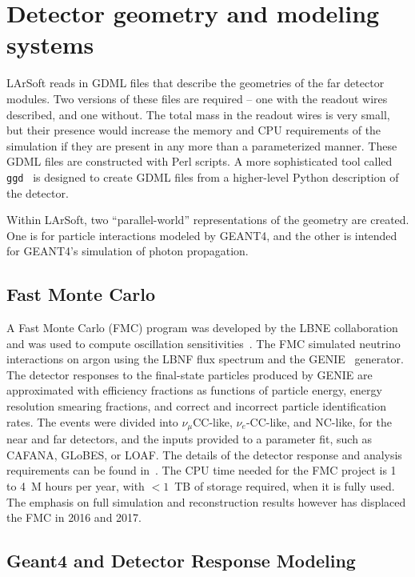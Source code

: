 \section{Detector geometry and modeling systems}

LArSoft reads in GDML files that describe the geometries of the far detector modules.  Two versions of these
files are required -- one with the readout wires described, and one without.  The total mass in the readout
wires is very small, but their presence would increase the memory and CPU requirements of the simulation
if they are present in any more than a parameterized manner.  These GDML files are constructed with Perl scripts.
A more sophisticated tool called {\tt{ggd}}~\cite{ref:ggd} is designed to create GDML files from a higher-level
Python description of the detector.

Within LArSoft, two ``parallel-world'' representations of the geometry are created.  One is for particle interactions
modeled by GEANT4, and the other is intended for GEANT4's simulation of photon propagation.

\subsection{Fast Monte Carlo}

A Fast Monte Carlo (FMC) program was developed by the LBNE collaboration and was used to
compute oscillation sensitivities~\cite{Acciarri:2015uup}.  The FMC simulated neutrino interactions
on argon using the LBNF flux spectrum and the GENIE~\cite{Andreopoulos:2009rq} generator.  The detector
responses to the final-state particles produced by GENIE are approximated with efficiency
fractions as functions of particle energy, energy resolution smearing fractions, and
correct and incorrect particle identification rates.  The events were divided into
$\nu_\mu$CC-like, $\nu_e$-CC-like, and NC-like, for the near and far detectors, and the
inputs provided to a parameter fit, such as CAFANA, GLoBES, or LOAF.  The details of the
detector response and analysis requirements can be found in~\cite{Acciarri:2015uup}.  The CPU time needed
for the FMC project is 1 to 4~M hours per year, with $<1$~TB of storage required, when
it is fully used.  The emphasis on full simulation and reconstruction results however has
displaced the FMC in 2016 and 2017. 

\subsection{Geant4 and Detector Response Modeling}

